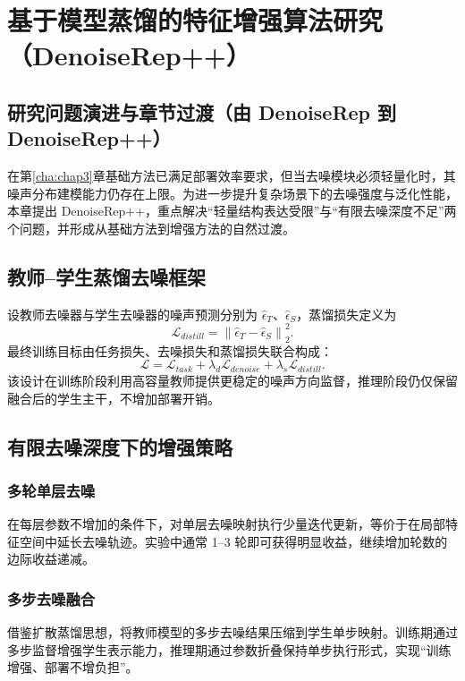 ﻿\setlength{\baselineskip}{20pt}
\chapter{基于模型蒸馏的特征增强算法研究（DenoiseRep++）}
\label{cha:chap4}

\section{研究问题演进与章节过渡（由 DenoiseRep 到 DenoiseRep++）}
在第\ref{cha:chap3}章基础方法已满足部署效率要求，但当去噪模块必须轻量化时，其噪声分布建模能力仍存在上限。为进一步提升复杂场景下的去噪强度与泛化性能，本章提出 DenoiseRep++，重点解决“轻量结构表达受限”与“有限去噪深度不足”两个问题，并形成从基础方法到增强方法的自然过渡。

\section{教师--学生蒸馏去噪框架}
设教师去噪器与学生去噪器的噪声预测分别为 $\hat{\epsilon}_T$、$\hat{\epsilon}_S$，蒸馏损失定义为
\begin{equation}
\mathcal{L}_{distill}=\left\|\hat{\epsilon}_T-\hat{\epsilon}_S\right\|_2^2.
\end{equation}
最终训练目标由任务损失、去噪损失和蒸馏损失联合构成：
\begin{equation}
\mathcal{L}=\mathcal{L}_{task}+\lambda_d\mathcal{L}_{denoise}+\lambda_s\mathcal{L}_{distill}.
\end{equation}
该设计在训练阶段利用高容量教师提供更稳定的噪声方向监督，推理阶段仍仅保留融合后的学生主干，不增加部署开销。

\section{有限去噪深度下的增强策略}
\subsection{多轮单层去噪}
在每层参数不增加的条件下，对单层去噪映射执行少量迭代更新，等价于在局部特征空间中延长去噪轨迹。实验中通常 1--3 轮即可获得明显收益，继续增加轮数的边际收益递减。

\subsection{多步去噪融合}
借鉴扩散蒸馏思想，将教师模型的多步去噪结果压缩到学生单步映射。训练期通过多步监督增强学生表示能力，推理期通过参数折叠保持单步执行形式，实现“训练增强、部署不增负担”。

